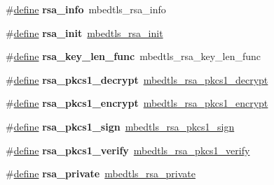 \begin{DoxyCompactItemize}
\item 
\mbox{\label{compat-1_83_8h_a8c7d425ac833776f873077cbf9234248}} 
\#\hyperlink{structdefine}{define} {\bfseries rsa\+\_\+info}~mbedtls\+\_\+rsa\+\_\+info
\item 
\mbox{\label{compat-1_83_8h_abde4a4fa8aab7486e5628ccefeea553e}} 
\#\hyperlink{structdefine}{define} {\bfseries rsa\+\_\+init}~\hyperlink{rsa_8h_a15b13ee0d1e7d6fd10f07571cc4ff9de}{mbedtls\+\_\+rsa\+\_\+init}
\item 
\mbox{\label{compat-1_83_8h_a78398579d386528d9bfe9c4664c8d8ac}} 
\#\hyperlink{structdefine}{define} {\bfseries rsa\+\_\+key\+\_\+len\+\_\+func}~mbedtls\+\_\+rsa\+\_\+key\+\_\+len\+\_\+func
\item 
\mbox{\label{compat-1_83_8h_a415394cd965d350fd07aa3d2b824bc44}} 
\#\hyperlink{structdefine}{define} {\bfseries rsa\+\_\+pkcs1\+\_\+decrypt}~\hyperlink{rsa_8h_a58f99b884b1697526061bedfe7be5570}{mbedtls\+\_\+rsa\+\_\+pkcs1\+\_\+decrypt}
\item 
\mbox{\label{compat-1_83_8h_aa1299854fee131031b0889a2c31a248a}} 
\#\hyperlink{structdefine}{define} {\bfseries rsa\+\_\+pkcs1\+\_\+encrypt}~\hyperlink{rsa_8h_a047b85b9483a9abecaf31af0caa2e7ff}{mbedtls\+\_\+rsa\+\_\+pkcs1\+\_\+encrypt}
\item 
\mbox{\label{compat-1_83_8h_a022e23386b166e93b9fc322ba4a5b934}} 
\#\hyperlink{structdefine}{define} {\bfseries rsa\+\_\+pkcs1\+\_\+sign}~\hyperlink{rsa_8h_a47d9e8989e233e986c59dc2aeb4a4caf}{mbedtls\+\_\+rsa\+\_\+pkcs1\+\_\+sign}
\item 
\mbox{\label{compat-1_83_8h_a4f75a6a504cc188e1b116e41bddd3639}} 
\#\hyperlink{structdefine}{define} {\bfseries rsa\+\_\+pkcs1\+\_\+verify}~\hyperlink{rsa_8h_a0aed18dcd3095b0ec29ed45a698a1935}{mbedtls\+\_\+rsa\+\_\+pkcs1\+\_\+verify}
\item 
\mbox{\label{compat-1_83_8h_aacebb82dfd25a8ca81bbf6dcac264ce3}} 
\#\hyperlink{structdefine}{define} {\bfseries rsa\+\_\+private}~\hyperlink{rsa_8h_a3e016741ddaa354916ade4d48e9a0965}{mbedtls\+\_\+rsa\+\_\+private}
\item 

\end{DoxyCompactItemize}
